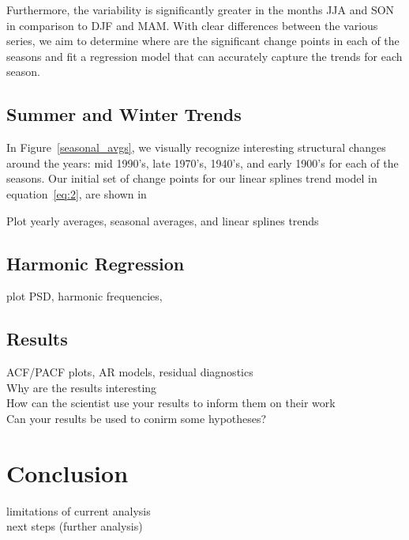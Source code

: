 \documentclass[12pt]{article}
\begin{document}
Furthermore, the variability is significantly greater in the months JJA and SON in comparison to DJF and MAM. With clear differences between the various series, we aim to determine where are the significant change points in each of the seasons and fit a regression model that can accurately capture the trends for each season.


\subsection{Summer and Winter Trends}
In Figure~\ref{seasonal_avgs}, we visually recognize interesting structural changes around the years: mid 1990's, late 1970's, 1940's, and early 1900's for each of the seasons. Our initial set of change points for our linear splines trend model in equation~\ref{eq:2}, are shown in 

Plot yearly averages, seasonal averages, and linear splines trends

\subsection{Harmonic Regression}
plot PSD, harmonic frequencies, 

\subsection{Results}
ACF/PACF plots, AR models, residual diagnostics\\
Why are the results interesting\\
How can the scientist use your results to inform them on their work\\
Can your results be used to conirm some hypotheses?\\


\section{Conclusion}
limitations of current analysis\\
next steps (further analysis)




\end{document}
